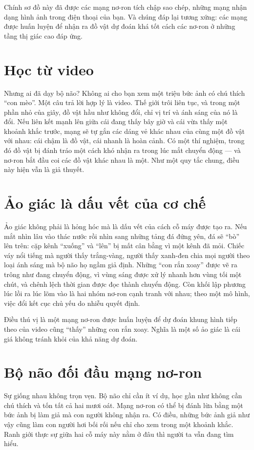 Chính sơ đồ này đã được các mạng nơ-ron tích chập sao chép, những mạng nhận dạng hình ảnh trong điện thoại của bạn. Và chúng đáp lại tương xứng: các mạng được huấn luyện để nhận ra đồ vật dự đoán khá tốt cách các nơ-ron ở những tầng thị giác cao đáp ứng.

\section*{Học từ video}

Nhưng ai đã dạy bộ não? Không ai cho bạn xem một triệu bức ảnh có chú thích ``con mèo''. Một câu trả lời hợp lý là video. Thế giới trôi liên tục, và trong một phần nhỏ của giây, đồ vật hầu như không đổi, chỉ vị trí và ánh sáng của nó là đổi. Nếu liên kết mạnh lên giữa cái đang thấy bây giờ và cái vừa thấy một khoảnh khắc trước, mạng sẽ tự gắn các dáng vẻ khác nhau của cùng một đồ vật với nhau: cái chậm là đồ vật, cái nhanh là hoàn cảnh. Có một thí nghiệm, trong đó đồ vật bị đánh tráo một cách khó nhận ra trong lúc mắt chuyển động --- và nơ-ron bắt đầu coi các đồ vật khác nhau là một. Như một quy tắc chung, điều này hiện vẫn là giả thuyết.

\section*{Ảo giác là dấu vết của cơ chế}

Ảo giác không phải là hỏng hóc mà là dấu vết của cách cỗ máy được tạo ra. Nếu mắt nhìn lâu vào thác nước rồi nhìn sang những tảng đá đứng yên, đá sẽ ``bò'' lên trên: cặp kênh ``xuống'' và ``lên'' bị mất cân bằng vì một kênh đã mỏi. Chiếc váy nổi tiếng mà người thấy trắng-vàng, người thấy xanh-đen chia mọi người theo loại ánh sáng mà bộ não họ ngầm giả định. Những ``con rắn xoay'' được vẽ ra trông như đang chuyển động, vì vùng sáng được xử lý nhanh hơn vùng tối một chút, và chênh lệch thời gian được đọc thành chuyển động. Còn khối lập phương lúc lồi ra lúc lõm vào là hai nhóm nơ-ron cạnh tranh với nhau; theo một mô hình, việc đổi kết cục chủ yếu do nhiễu quyết định.

Điều thú vị là một mạng nơ-ron được huấn luyện để dự đoán khung hình tiếp theo của video cũng ``thấy'' những con rắn xoay. Nghĩa là một số ảo giác là cái giá không tránh khỏi của khả năng dự đoán.

\section*{Bộ não đối đầu mạng nơ-ron}

Sự giống nhau không trọn vẹn. Bộ não chỉ cần ít ví dụ, học gần như không cần chú thích và tốn tất cả hai mươi oát. Mạng nơ-ron có thể bị đánh lừa bằng một bức ảnh bị làm giả mà con người không nhận ra. Có điều, những bức ảnh giả như vậy cũng làm con người hơi bối rối nếu chỉ cho xem trong một khoảnh khắc. Ranh giới thực sự giữa hai cỗ máy này nằm ở đâu thì người ta vẫn đang tìm hiểu.

